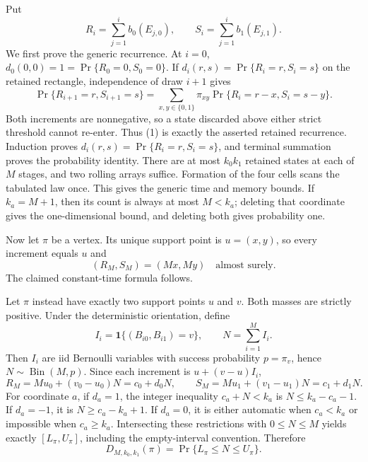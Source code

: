 Put
\[
R_i=\sum_{j=1}^i b_0(E_{j,0}),\qquad
S_i=\sum_{j=1}^i b_1(E_{j,1}).
\]
We first prove the generic recurrence. At \(i=0\), \(d_0(0,0)=1=\Pr\{R_0=0,S_0=0\}\). If \(d_i(r,s)=\Pr\{R_i=r,S_i=s\}\) on the retained rectangle, independence of draw \(i+1\) gives
\[
\Pr\{R_{i+1}=r,S_{i+1}=s\}
=\sum_{x,y\in\{0,1\}}\pi_{xy}
\Pr\{R_i=r-x,S_i=s-y\}.
\tag{1}
\]
Both increments are nonnegative, so a state discarded above either strict threshold cannot re-enter. Thus (1) is exactly the asserted retained recurrence. Induction proves \(d_i(r,s)=\Pr\{R_i=r,S_i=s\}\), and terminal summation proves the probability identity. There are at most \(k_0k_1\) retained states at each of \(M\) stages, and two rolling arrays suffice. Formation of the four cells scans the tabulated law once. This gives the generic time and memory bounds. If \(k_a=M+1\), then its count is always at most \(M<k_a\); deleting that coordinate gives the one-dimensional bound, and deleting both gives probability one.

Now let \(\pi\) be a vertex. Its unique support point is \(u=(x,y)\), so every increment equals \(u\) and
\[
(R_M,S_M)=(Mx,My)\quad\text{almost surely}.
\tag{2}
\]
The claimed constant-time formula follows.

Let \(\pi\) instead have exactly two support points \(u\) and \(v\). Both masses are strictly positive. Under the deterministic orientation, define
\[
I_i=\mathbf 1\{(B_{i0},B_{i1})=v\},\qquad
N=\sum_{i=1}^M I_i.
\]
Then \(I_i\) are iid Bernoulli variables with success probability \(p=\pi_v\), hence \(N\sim\operatorname{Bin}(M,p)\). Since each increment is \(u+(v-u)I_i\),
\[
R_M=Mu_0+(v_0-u_0)N=c_0+d_0N,\qquad
S_M=Mu_1+(v_1-u_1)N=c_1+d_1N.
\tag{3}
\]
For coordinate \(a\), if \(d_a=1\), the integer inequality \(c_a+N<k_a\) is \(N\le k_a-c_a-1\). If \(d_a=-1\), it is \(N\ge c_a-k_a+1\). If \(d_a=0\), it is either automatic when \(c_a<k_a\) or impossible when \(c_a\ge k_a\). Intersecting these restrictions with \(0\le N\le M\) yields exactly \([L_\pi,U_\pi]\), including the empty-interval convention. Therefore
\[
D_{M,k_0,k_1}(\pi)=\Pr\{L_\pi\le N\le U_\pi\}.
\tag{4}
\]

